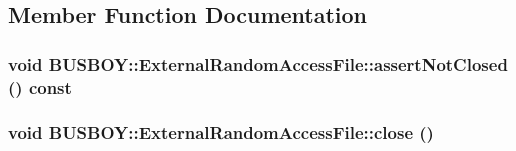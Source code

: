\subsection{Member Function Documentation}
\hypertarget{classBUSBOY_1_1ExternalRandomAccessFile_a6212db53d942a177e41fcd54eccaa687}{
\subsubsection[{assertNotClosed}]{\setlength{\rightskip}{0pt plus 5cm}void BUSBOY::ExternalRandomAccessFile::assertNotClosed () const}}
\label{classBUSBOY_1_1ExternalRandomAccessFile_a6212db53d942a177e41fcd54eccaa687}
\hypertarget{classBUSBOY_1_1ExternalRandomAccessFile_a9a59b70aa2a9cb50c484bf6a9e7ef8cd}{
\subsubsection[{close}]{\setlength{\rightskip}{0pt plus 5cm}void BUSBOY::ExternalRandomAccessFile::close ()}}
\label{classBUSBOY_1_1ExternalRandomAccessFile_a9a59b70aa2a9cb50c484bf6a9e7ef8cd}


